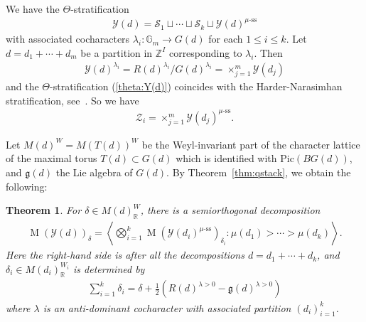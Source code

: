 \documentclass [11pt,oneside,a4paper,mathscr]{amsart}
\newtheorem{thm}{Theorem}[section]
\theoremstyle{definition}
\renewcommand{\leq}{\leqslant}
\newcommand{\Y}{\mathcal{Y}}
\newcommand{\MM}{\operatorname{M}}
\begin{document}
We have the $\Theta$-stratification 
\begin{align}\label{theta:Y(d)}
    \mathcal{Y}(d)=\mathcal{S}_1 \sqcup \cdots \sqcup \mathcal{S}_k \sqcup \mathcal{Y}(d)^{\mu\text{-ss}}
\end{align}
with associated cocharacters $\lambda_i \colon \mathbb{G}_m \to G(d)$ for each $1\leq i \leq k$. Let $d=d_1+\cdots+d_m$ be a partition in $\mathbb{Z}^I$ corresponding to $\lambda_i$. 
    Then 
    \begin{align*}\Y(d)^{\lambda_i}=R(d)^{\lambda_i}/G(d)^{\lambda_i}
    =\times_{j=1}^m \Y(d_j)
    \end{align*}
    and the $\Theta$-stratification (\ref{theta:Y(d)}) coincides with the Harder-Narasimhan 
    stratification, see~\cite[Section~5]{P0}. So we have 
    \begin{align*}
        \mathcal{Z}_i=\times_{j=1}^m \Y(d_j)^{\mu\text{-ss}}.
    \end{align*}

Let $M(d)^W=M(T(d))^W$ be the Weyl-invariant part of the character lattice 
of the maximal torus $T(d) \subset G(d)$ which is identified with $\mathrm{Pic}(BG(d))$, and $\mathfrak{g}(d)$ the Lie algebra 
of $G(d)$. 
By Theorem~\ref{thm:qstack}, we obtain the following: 
\begin{thm}\label{thm:quiver}
For $\delta \in M(d)_{\mathbb{R}}^W$, there is a semiorthogonal decomposition
\begin{align*}
    \MM(\Y(d))_{\delta}=\left\langle  \bigotimes_{i=1}^k \MM(\Y(d_i)^{\mu\text{-ss}})_{\delta_i} :
    \mu(d_1)>\cdots> \mu(d_k) \right\rangle. 
\end{align*}
Here the right-hand side is after all the decompositions $d=d_1+\cdots+d_k$, and 
$\delta_i\in M(d_i)^{W_i}_{\mathbb{R}}$ is determined by 
\begin{align*}
    \sum_{i=1}^k \delta_i=\delta+\frac{1}{2}(R(d)^{\lambda>0}-\mathfrak{g}(d)^{\lambda>0})
\end{align*}
where $\lambda$ is an anti-dominant cocharacter with associated partition 
$(d_i)_{i=1}^k$.     
\end{thm}
\end{document}
